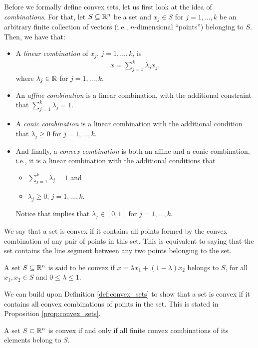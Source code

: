 Before we formally define convex sets, let us first look at the idea of \emph{combinations}. For that, let $S \subseteq \mathbb{R}^n$ be a set and $x_j \in S$ for $j=1,\dots,k$ be an arbitrary finite collection of vectors (i.e., $n$-dimensional ``points'') belonging to $S$. Then, we have that:
%
\begin{itemize} 
	\item A \emph{linear combination} of $x_j$,  $j=1,\dots, k$, is
%
	\begin{align}
		x = \sum_{j=1}^k \lambda_jx_j, 
	\end{align}
%
where $\lambda_j \in \mathbb{R}$ for $j=1,\dots,k$.
	\item An \emph{affine combination} is a linear combination, with the additional constraint that $\sum_{j=1}^k \lambda_j = 1$. 
%
	\item A \emph{conic combination} is a linear combination with the additional condition that $\lambda_j \geq 0$ for $j = 1,\dots,k$.
%
	\item And finally, a \emph{convex combination} is both an affine and a conic combination, i.e., it is a linear combination with the additional conditions that 
		\begin{itemize}
			\item $\sum_{j=1}^k \lambda_j=1$ and  
			\item $\lambda_j \ge 0$, $j = 1,\dots,k$.  
		\end{itemize}
		Notice that implies that $\lambda_j \in [0,1]$ for $j = 1,\dots,k$.
% 
\end{itemize}

We say that a set is convex if it contains all points formed by the convex combination of any pair of points in this set. This is equivalent to saying that the set contains the line segment between any two points belonging to the set. 

\begin{definition} \label{def:convex_sets}
	A set $S \subseteq \mathbb{R}^n$ is said to be convex if $x = \lambda x_1 + (1- \lambda)x_2$ belongs to $S$, for all $x_1, x_2 \in S$ and $0 \le \lambda \le 1$.
\end{definition}

We can build upon Definition \ref{def:convex_sets} to show that a set is convex if it contains all convex combinations of points in the set. This is stated in Proposition \ref{prop:convex_sets}.

\begin{proposition}
	\label{prop:convex_sets}
	A set $S \subset \mathbb{R}^n$ is convex if and only if all finite convex combinations of its elements belong to $S$.
\end{proposition}

